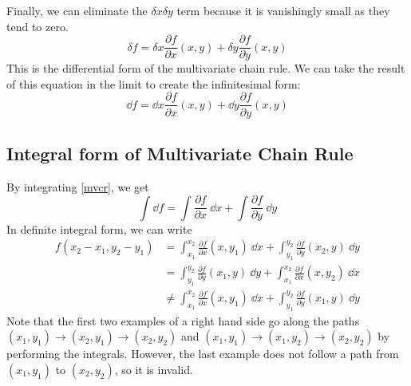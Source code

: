 Finally, we can eliminate the \(\delta x \delta y\) term because it is vanishingly small as they tend to zero.
\begin{equation}
	\delta f = \delta x \frac{\partial f}{\partial x}(x, y) +
	\delta y\frac{\partial f}{\partial y}(x, y)
\end{equation}
This is the differential form of the multivariate chain rule. We can take the result of this equation in the limit to create the infinitesimal form:
\begin{equation}\label{mvcr}
	\dd{f} = \dd{x} \frac{\partial f}{\partial x}(x, y) +
	\dd{y}\frac{\partial f}{\partial y}(x, y)
\end{equation}

\subsection{Integral form of Multivariate Chain Rule}
By integrating \eqref{mvcr}, we get
\[ \int \dd{f} = \int \frac{\partial f}{\partial x}\ \dd{x} + \int \frac{\partial f}{\partial y}\ \dd{y} \]
In definite integral form, we can write
\begin{align*}
	f(x_2 - x_1, y_2 - y_1) & = \int_{x_1}^{x_2} \frac{\partial f}{\partial x}(x, y_1)\ \dd{x} + \int_{y_1}^{y_2} \frac{\partial f}{\partial y}(x_2, y)\ \dd{y}    \\
	                        & = \int_{y_1}^{y_2} \frac{\partial f}{\partial y}(x_1, y)\ \dd{y} + \int_{x_1}^{x_2} \frac{\partial f}{\partial x}(x, y_2)\ \dd{x}    \\
	                        & \neq \int_{x_1}^{x_2} \frac{\partial f}{\partial x}(x, y_1)\ \dd{x} + \int_{y_1}^{y_2} \frac{\partial f}{\partial y}(x_1, y)\ \dd{y}
\end{align*}
Note that the first two examples of a right hand side go along the paths \((x_1, y_1) \to (x_2, y_1) \to (x_2, y_2)\) and \((x_1, y_1) \to (x_1, y_2) \to (x_2, y_2)\) by performing the integrals. However, the last example does not follow a path from \((x_1, y_1)\) to \((x_2, y_2)\), so it is invalid.
